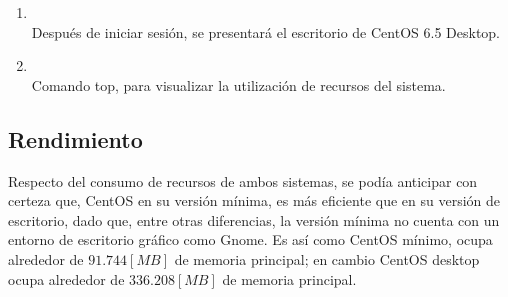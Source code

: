 \documentclass[11pt]{article}
\begin{document}
\begin{enumerate}
	        \item
	        	\begin{minipage}[t]{\linewidth}
			        \raggedright
			        \medskip
			        \\Después de iniciar sesión, se presentará el escritorio de CentOS 6.5 Desktop.
		        \end{minipage}

		    \item
	        	\begin{minipage}[t]{\linewidth}
			        \raggedright
			        \medskip
			        \\Comando top, para visualizar la utilización de recursos del sistema.
		        \end{minipage}
		    \end{enumerate}

		    
\subsection{Rendimiento}
Respecto del consumo de recursos de ambos sistemas, se podía anticipar con certeza que, CentOS en su versión mínima, es más eficiente que en su versión de escritorio, dado que, entre otras diferencias, la versión mínima no cuenta con un entorno de escritorio gráfico como Gnome. Es así como CentOS mínimo, ocupa alrededor de $91.744 [MB]$ de memoria principal; en cambio CentOS desktop ocupa alrededor de $336.208 [MB]$ de memoria principal. 
\end{document}
